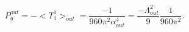 \begin{equation}
 P^{out}_{g}=-<T^{1}_{1}>_{out}=\frac{-1}{960\pi^{2}\alpha_{out}^{4}}=
 \frac{-\Lambda_{out}^{2}}{9}\frac{1}{960\pi^{2}}.
 \end{equation}

